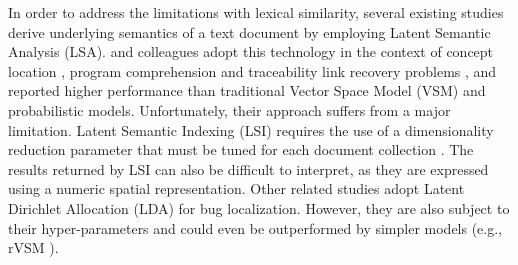 \documentclass[conference]{IEEEtran}
\begin{document}

In order to address the limitations with lexical similarity, several existing studies \cite{Maletic, MarcusMaletic,irmarcus} derive underlying semantics of a text document by employing Latent Semantic Analysis (LSA). \citeauthor{irmarcus} and colleagues adopt this technology in the context of concept location \cite{irmarcus,MarcusMaletic}, program comprehension \cite{Maletic} and traceability link recovery problems \cite{MarcusLSI}, and reported higher performance than traditional Vector Space Model (VSM) and probabilistic models.
Unfortunately, their approach suffers from a major limitation.
Latent Semantic Indexing (LSI) requires the use of a dimensionality reduction parameter that must be tuned for each document collection \cite{Kontostathis}.
The results returned by LSI can also be difficult to interpret, as
they are expressed using a numeric spatial representation.
Other related studies \cite{LukinsBL,Nguyen} adopt Latent Dirichlet Allocation (LDA) for bug localization. However, they are also subject to their hyper-parameters and could even be outperformed by simpler models (e.g., rVSM \cite{Jian}).   

\end{document}
